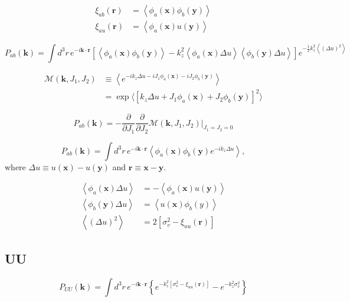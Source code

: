 \documentclass[a4paper,11pt, fleqn]{article}
\begin{document}
\begin{align}
  \xi_{ab}(\bm{r}) &= \left\langle \phi_a(\bm{x}) \phi_b(\bm{y}) \right\rangle\\
  \xi_{au}(\bm{r}) &= \left\langle \phi_a(\bm{x}) u(\bm{y})\right\rangle
\end{align}

\begin{equation}
  P_{ab}(\bm{k}) = \int\! d^3 r \, e^{-i\bm{k}\cdot\bm{r}}
  \left[
    \left\langle \phi_a(\bm{x}) \phi_b(\bm{y}) \right\rangle
    - k_z^2 \left\langle \phi_a(\bm{x}) \Delta u\right\rangle
      \left\langle \phi_b(\bm{y}) \Delta u\right\rangle    
  \right] e^{-\frac{1}{2} k_z^2 \left\langle (\Delta u)^2 \right\rangle}
\end{equation}

\begin{align}
  \mathcal{M}(\bm{k}, J_1, J_2)
  &\equiv \left\langle e^{-ik_z \Delta u -i J_1 \phi_a(\bm{x}) -i J_2 \phi_b(\bm{y})}
          \right\rangle\\
  &= \exp \Big\langle \left[ k_z \Delta u
            + J_1 \phi_a(\bm{x}) + J_2 \phi_b(\bm{y}) \right]^2 \Big\rangle
\end{align}

\begin{equation}
  P_{ab}(\bm{k}) = -\frac{\partial}{\partial J_1} \frac{\partial}{\partial J_2}
  \mathcal{M}(\bm{k}, J_1, J_2) \Big|_{J_1 = J_2 = 0}
\end{equation}

\begin{equation}
  P_{ab}(\bm{k}) = \int\! d^3 r \, e^{-i\bm{k}\cdot\bm{r}} \left\langle
                   \phi_a(\bm{x}) \phi_b(\bm{y}) e^{-ik_z \Delta u} \right\rangle,
\end{equation}
where $\Delta u \equiv u(\bm{x}) - u(\bm{y})$ and $\bm{r} \equiv \bm{x} - \bm{y}$.

\begin{align}
  \left\langle \phi_a(\bm{x}) \Delta u \right\rangle
    &= -\left\langle \phi_a(\bm{x}) u(\bm{y}) \right\rangle\\
  \left\langle \phi_b(\bm{y}) \Delta u \right\rangle
    &= \left\langle u(\bm{x}) \phi_b(y) \right\rangle\\
  \left\langle (\Delta u)^2 \right\rangle
  &= 2 \left[\sigma_v^2 - \xi_{uu}(\bm{r})\right]
\end{align}

\clearpage
\subsection{UU}
\begin{equation}
  P_{UU}(\bm{k}) = \int\!\! d^3 r \, e^{-i\bm{k}\cdot\bm{r}}\left\{
  e^{-k_z^2 \left[ \sigma_v^2 - \xi_{uu}(\bm{r}) \right]} - e^{-k_z^2 \sigma_v^2}
  \right\}
\end{equation}
\end{document}
